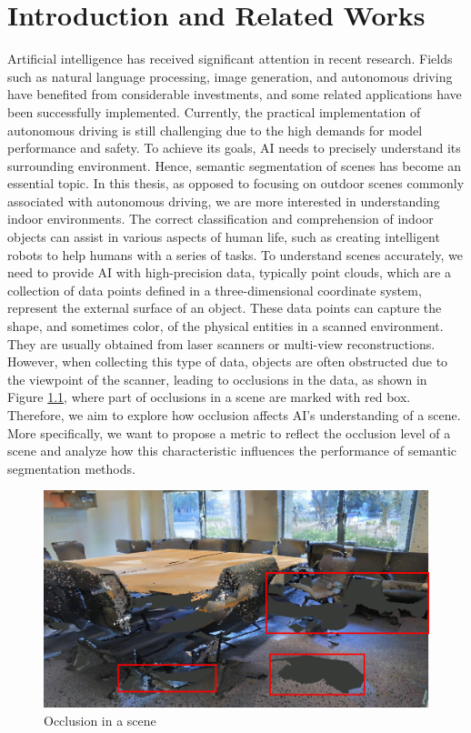 \documentclass[11pt, a4paper,oneside,chapterprefix=false]{scrbook}
\begin{document}
\chapter{Introduction and Related Works} \label{chp:introduction}


Artificial intelligence has received significant attention in recent research. Fields such as natural language processing, image generation, and autonomous driving have benefited from considerable investments, and some related applications have been successfully implemented. Currently, the practical implementation of autonomous driving is still challenging due to the high demands for model performance and safety. To achieve its goals, AI needs to precisely understand its surrounding environment. Hence, semantic segmentation of scenes has become an essential topic. In this thesis, as opposed to focusing on outdoor scenes commonly associated with autonomous driving, we are more interested in understanding indoor environments. The correct classification and comprehension of indoor objects can assist in various aspects of human life, such as creating intelligent robots to help humans with a series of tasks. To understand scenes accurately, we need to provide AI with high-precision data, typically point clouds, which are a collection of data points defined in a three-dimensional coordinate system, represent the external surface of an object. These data points can capture the shape, and sometimes color, of the physical entities in a scanned environment. They are usually obtained from laser scanners or multi-view reconstructions. However, when collecting this type of data, objects are often obstructed due to the viewpoint of the scanner, leading to occlusions in the data, as shown in Figure \ref{fig:occlusion in a scene}, where part of occlusions in a scene are marked with red box. Therefore, we aim to explore how occlusion affects AI's understanding of a scene. More specifically, we want to propose a metric to reflect the occlusion level of a scene and analyze how this characteristic influences the performance of semantic segmentation methods.


\begin{figure}[h]
    \centering
    \includegraphics*[width=1.0\textwidth]{figures/occlusion in conf2.png}
    \caption{Occlusion in a scene}
    \label{fig:occlusion in a scene}
\end{figure}
\end{document}
